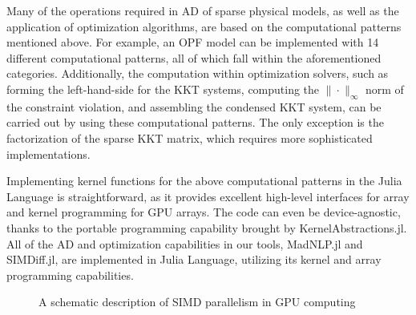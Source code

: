 Many of the operations required in AD of sparse
physical models, as well as the application of optimization
algorithms, are based on the computational patterns mentioned
above. For example, an OPF model can be implemented
with 14 different computational patterns, all of which fall within the
aforementioned categories. Additionally, the computation within
optimization solvers, such as forming the left-hand-side for the KKT
systems, computing the $\|\cdot\|_\infty$ norm of the constraint
violation, and assembling the condensed KKT system, can be carried out
by using these computational patterns. The only exception is the
factorization of the sparse KKT matrix, which requires more sophisticated
implementations.

Implementing kernel functions for the above computational patterns in
the Julia Language is straightforward, as it provides excellent
high-level interfaces for array and kernel programming for GPU
arrays. The code can even be device-agnostic, thanks to the portable
programming capability brought by KernelAbstractions.jl. All
of the AD and optimization capabilities in our
tools, MadNLP.jl and SIMDiff.jl, are implemented in Julia Language,
utilizing its kernel and array programming capabilities.

\begin{figure}[t]
  \centering 
  \label{fig:simd}
  \caption{A schematic description of SIMD parallelism in GPU computing}
\end{figure}

